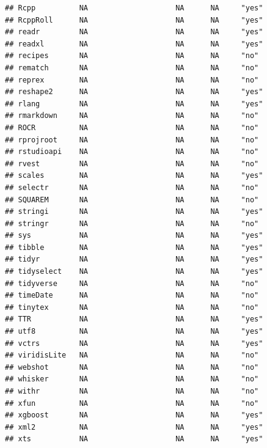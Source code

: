 \documentclass[]{article}
\begin{document}
\begin{verbatim}
## Rcpp          NA                    NA      NA     "yes"           
## RcppRoll      NA                    NA      NA     "yes"           
## readr         NA                    NA      NA     "yes"           
## readxl        NA                    NA      NA     "yes"           
## recipes       NA                    NA      NA     "no"            
## rematch       NA                    NA      NA     "no"            
## reprex        NA                    NA      NA     "no"            
## reshape2      NA                    NA      NA     "yes"           
## rlang         NA                    NA      NA     "yes"           
## rmarkdown     NA                    NA      NA     "no"            
## ROCR          NA                    NA      NA     "no"            
## rprojroot     NA                    NA      NA     "no"            
## rstudioapi    NA                    NA      NA     "no"            
## rvest         NA                    NA      NA     "no"            
## scales        NA                    NA      NA     "yes"           
## selectr       NA                    NA      NA     "no"            
## SQUAREM       NA                    NA      NA     "no"            
## stringi       NA                    NA      NA     "yes"           
## stringr       NA                    NA      NA     "no"            
## sys           NA                    NA      NA     "yes"           
## tibble        NA                    NA      NA     "yes"           
## tidyr         NA                    NA      NA     "yes"           
## tidyselect    NA                    NA      NA     "yes"           
## tidyverse     NA                    NA      NA     "no"            
## timeDate      NA                    NA      NA     "no"            
## tinytex       NA                    NA      NA     "no"            
## TTR           NA                    NA      NA     "yes"           
## utf8          NA                    NA      NA     "yes"           
## vctrs         NA                    NA      NA     "yes"           
## viridisLite   NA                    NA      NA     "no"            
## webshot       NA                    NA      NA     "no"            
## whisker       NA                    NA      NA     "no"            
## withr         NA                    NA      NA     "no"            
## xfun          NA                    NA      NA     "no"            
## xgboost       NA                    NA      NA     "yes"           
## xml2          NA                    NA      NA     "yes"           
## xts           NA                    NA      NA     "yes"           

\end{verbatim}
\end{document}
